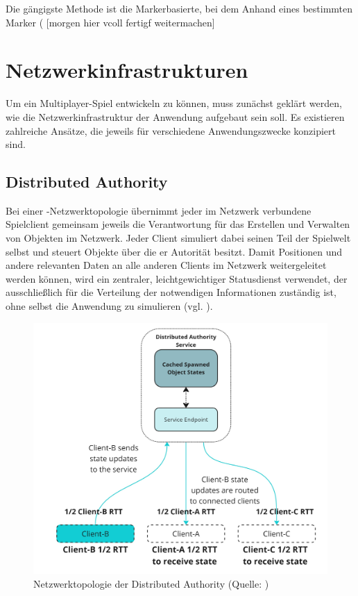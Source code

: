 Die gängigste Methode ist die Markerbasierte, bei dem Anhand eines bestimmten Marker ( [morgen hier vcoll fertigf weitermachen]


\section{Netzwerkinfrastrukturen}\label{sec:basics-network-structures}
Um ein Multiplayer-Spiel entwickeln zu können, muss zunächst geklärt werden, wie die Netzwerkinfrastruktur der Anwendung aufgebaut sein soll. Es existieren zahlreiche Ansätze, die jeweils für verschiedene Anwendungszwecke konzipiert sind.

\subsection{Distributed Authority}
Bei einer -Netzwerktopologie übernimmt jeder im Netzwerk verbundene Spielclient gemeinsam jeweils die Verantwortung für das Erstellen und Verwalten von Objekten im Netzwerk. Jeder Client simuliert dabei seinen Teil der Spielwelt selbst und steuert Objekte über die er Autorität besitzt.
Damit Positionen und andere relevanten Daten an alle anderen Clients im Netzwerk weitergeleitet werden können, wird ein zentraler, leichtgewichtiger Statusdienst verwendet, der ausschließlich für die Verteilung der notwendigen Informationen zuständig ist, ohne selbst die Anwendung zu simulieren (vgl. \cite{noauthor_distributed_2025}).

\begin{figure}[ht]
\centering
\includegraphics[width=1\linewidth]{content/pictures/distributed-authority-service.jpg}
\caption{Netzwerktopologie der Distributed Authority (Quelle: \cite{noauthor_distributed_2025})}
\label{fig:distributed_authority_topology}
\end{figure}

